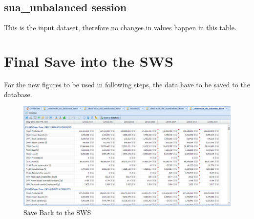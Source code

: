 \documentclass[]{article}
\begin{document}
\subsection{sua\_unbalanced session}\label{sua_unbalanced-session}

This is the input dataset, therefore no changes in values happen in this
table.

\section{Final Save into the SWS}\label{final-save-into-the-sws}

For the new figures to be used in following steps, the data have to be
saved to the database.

\begin{figure}[H]

{\centering \includegraphics[width=1\linewidth]{images/standPlugin/36_saveBack} 

}

\caption{\label{fig:f38}Save Back to the SWS}\label{fig:f38}
\end{figure}
\end{document}
